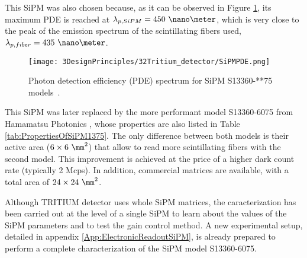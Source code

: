 This SiPM was also chosen because, as it can be observed in Figure \ref{fig:PDESiPM}, its maximum PDE is reached at $\lambda_{p,SiPM}=450~\nano\meter$, which is very close to the peak of the emission spectrum of the scintillating fibers used, $\lambda_{p,fiber}=435~\nano\meter$.

\begin{figure}[htbp]
\centering
\texttt{[image: 3DesignPrinciples/32Tritium\_detector/SiPMPDE.png]}
\caption{Photon detection efficiency (PDE) spectrum for SiPM S13360-**75 models~\cite{DataSheetHammamatsu_1_SiPM_1375}.\label{fig:PDESiPM}}
\end{figure}

This SiPM was later replaced by the more performant model S13360-6075 from Hamamatsu Photonics \cite{DataSheetHammamatsu_1_SiPM_75}, whose properties are also listed in Table \ref{tab:PropertiesOfSiPM1375}. The only difference between both models is their active area ($6\times6~\mm^2$) that allow to read more scintillating fibers with the second model. This improvement is achieved at the price of a higher dark count rate (typically 2 Mcps). In addition, commercial matrices are available, with a total area of $24\times24~\mm^2$.

Although TRITIUM detector uses whole SiPM matrices, the caracterization has been carried out at the level of a single SiPM to learn about the values of the SiPM parameters and to test the gain control method. A new experimental setup, detailed in appendix \ref{App:ElectronicReadoutSiPM}, is already  prepared to perform a complete characterization of the SiPM model S13360-6075.